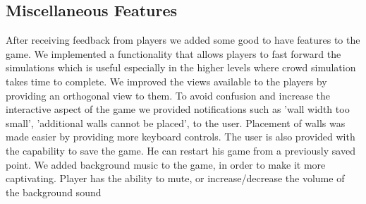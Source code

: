 \subsection{Miscellaneous Features}
After receiving feedback from players we added some good to have features to the game. We implemented a functionality that allows players to fast forward the simulations which is useful especially in the higher levels where crowd simulation takes time to complete. We improved the views available to the players by providing an orthogonal view to them. To avoid confusion and increase the interactive aspect of the game we provided notifications such as 'wall width too small', 'additional walls cannot be placed', to the user. Placement of walls was made easier by providing more keyboard controls. The user is also provided with the capability to save the game. He can restart his game from a previously saved point. We added background music to the game, in order to make it more captivating. Player has the ability to mute, or increase/decrease the volume of the background sound
















































